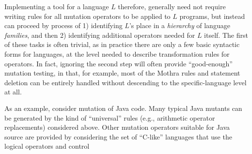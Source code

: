 \documentclass[sigconf,review, anonymous]{acmart}
\begin{document}
Implementing a tool for a language $L$ therefore, generally need not
require writing rules for all mutation operators to be applied to $L$
programs, but instead can proceed by process of 1) identifying $L$'s
place in a \emph{hierarchy} of language \emph{families}, and then 2)
identifying additional operators needed for $L$ itself.  The first of
these tasks is often trivial, as in practice there are only a few
basic syntactic forms for languages, at the level needed to describe
transformation rules for operators.  In fact, ignoring the second step
will often provide ``good-enough'' mutation testing, in that, for
example, most of the Mothra rules and statement deletion can be
entirely handled without descending to the specific-language level at all.

As an
example, consider mutation of Java code.  Many typical Java mutants can be
generated by the kind of ``universal'' rules (e.g., arithmetic
operator replacements) considered above.  Other mutation operators
suitable for Java source are provided by considering the set of
``C-like'' languages that use the logical operators and control
\end{document}
